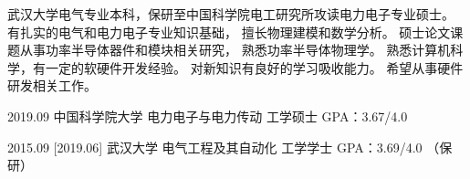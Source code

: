 \documentclass[zh]{resume}
\begin{document}
\makeheader

{\onehalfspacing\hspace{2em}%
武汉大学电气专业本科，保研至中国科学院电工研究所攻读电力电子专业硕士。
有扎实的电气和电力电子专业知识基础，
擅长物理建模和数学分析。
硕士论文课题从事功率半导体器件和模块相关研究，
熟悉功率半导体物理学。
熟悉计算机科学，有一定的软硬件开发经验。
对新知识有良好的学习吸收能力。
希望从事硬件研发相关工作。
\par}

\begin{educations}
  \education%
    {2019.09}%
    {中国科学院大学}%
    {电力电子与电力传动}%
    {工学硕士}%
    {GPA：3.67/4.0}
    

  \separator{0.1ex}
  \education%
    {2015.09}%
    [2019.06]%
    {武汉大学}%
    {电气工程及其自动化}%
    {工学学士}%
    {GPA：3.69/4.0 （保研）}
\end{educations}

\begin{competences}

    
\end{competences}
\end{document}
